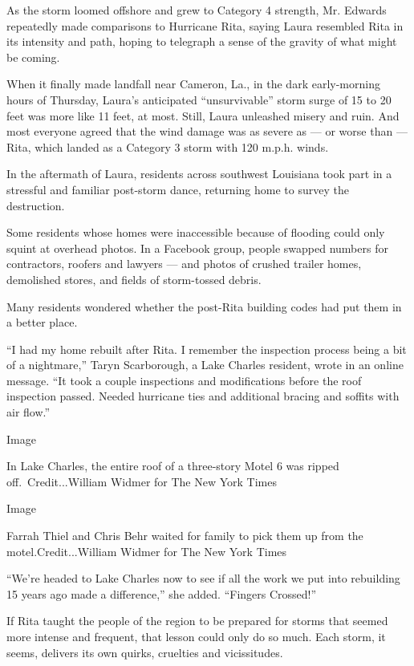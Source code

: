 As the storm loomed offshore and grew to Category 4 strength, Mr.
Edwards repeatedly made comparisons to Hurricane Rita, saying Laura
resembled Rita in its intensity and path, hoping to telegraph a sense of
the gravity of what might be coming.

When it finally made landfall near Cameron, La., in the dark
early-morning hours of Thursday, Laura's anticipated ``unsurvivable''
storm surge of 15 to 20 feet was more like 11 feet, at most. Still,
Laura unleashed misery and ruin. And most everyone agreed that the wind
damage was as severe as --- or worse than --- Rita, which landed as a
Category 3 storm with 120 m.p.h. winds.

In the aftermath of Laura, residents across southwest Louisiana took
part in a stressful and familiar post-storm dance, returning home to
survey the destruction.

Some residents whose homes were inaccessible because of flooding could
only squint at overhead photos. In a Facebook group, people swapped
numbers for contractors, roofers and lawyers --- and photos of crushed
trailer homes, demolished stores, and fields of storm-tossed debris.

Many residents wondered whether the post-Rita building codes had put
them in a better place.

``I had my home rebuilt after Rita. I remember the inspection process
being a bit of a nightmare,'' Taryn Scarborough, a Lake Charles
resident, wrote in an online message. ``It took a couple inspections and
modifications before the roof inspection passed. Needed hurricane ties
and additional bracing and soffits with air flow.''

Image

In Lake Charles, the entire roof of a three-story Motel 6 was ripped
off.~Credit...William Widmer for The New York Times

Image

Farrah Thiel and Chris Behr waited for family to pick them up from the
motel.Credit...William Widmer for The New York Times

``We're headed to Lake Charles now to see if all the work we put into
rebuilding 15 years ago made a difference,'' she added. ``Fingers
Crossed!''

If Rita taught the people of the region to be prepared for storms that
seemed more intense and frequent, that lesson could only do so much.
Each storm, it seems, delivers its own quirks, cruelties and
vicissitudes.


